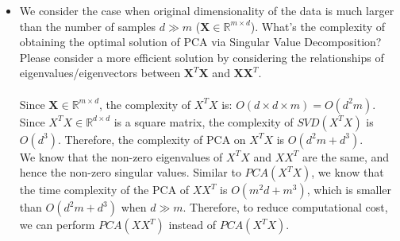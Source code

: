 \documentclass[11pt]{article}
\newcommand{\R}{\mathbb{R}}
\newcommand{\mtx}[1]{\mathbf{#1}}
\def \mX {\mtx{X}}
\def \R {\mathbb{R}}
\begin{document}
\begin{itemize}
	\item We consider the case when original dimensionality of the data is much larger than the number of samples $d\gg m$ ($\mX\in\R^{m\times d}$). What's the complexity of obtaining the optimal solution of PCA via Singular Value Decomposition? Please consider a more efficient solution by considering the relationships of eigenvalues/eigenvectors between $\mX^T\mX$
	 and $\mX\mX^T$.\\ \\
	 Since $\mX\in\R^{m\times d}$, the complexity of $X^TX$ is: $O(d\times d\times m)=O(d^2m)$. Since $X^TX\in \R^{d\times d}$ is a square matrix, the complexity of $SVD(X^TX)$ is $O(d^3)$. Therefore, the complexity of PCA on $X^TX$ is $O(d^2m + d^3)$.\\
	 We know that the non-zero eigenvalues of $X^TX$ and $XX^T$ are the same, and hence the non-zero singular values. Similar to $PCA(X^TX)$, we know that the time complexity of the PCA of $XX^T$ is $O(m^2d + m^3)$, which is smaller than $O(d^2m + d^3)$ when $d\gg m$. Therefore, to reduce computational cost, we can perform $PCA(XX^T)$ instead of $PCA(X^TX)$.
	 
	 
\end{itemize}


\newpage
\end{document}
